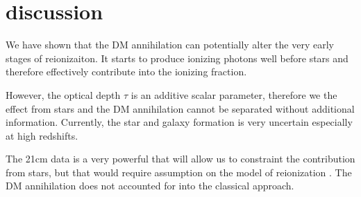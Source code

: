 \section{discussion}

We have shown that the DM annihilation can potentially alter the very early stages of reionizaiton. It starts to produce ionizing photons well before stars and therefore effectively contribute into the ionizing fraction. 

However, the optical depth $\tau$ is an additive scalar parameter, therefore we the effect from stars and the DM annihilation cannot be separated without additional information. Currently, the star and galaxy formation is very uncertain especially at high redshifts.

The 21cm data is a very powerful that will allow us to constraint the contribution from stars, but that would require assumption on the model of reionization \cite{2015arXiv150908463L}. The DM annihilation does not accounted for into the classical approach.